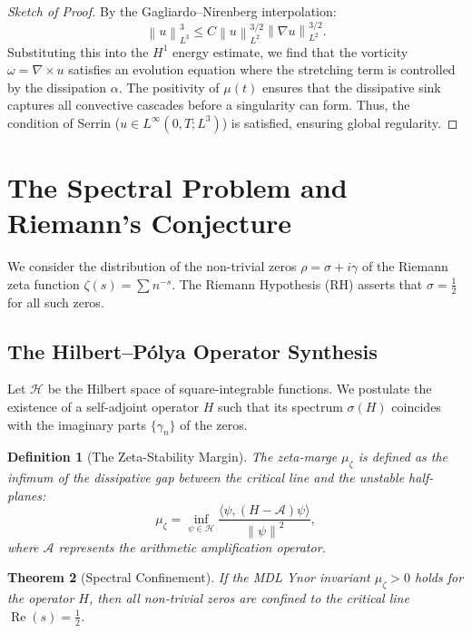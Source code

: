 \documentclass[11pt,a4paper]{amsart}
\newtheorem{theorem}{Theorem}[section]
\newtheorem{definition}[theorem]{Definition}
\newcommand{\alphacoeff}{\ensuremath{\alpha}}
\newcommand{\mumargin}{\ensuremath{\mu}}
\newcommand{\norm}[1]{\left\|#1\right\|}
\begin{document}
\begin{proof}[Sketch of Proof]
By the Gagliardo--Nirenberg interpolation:
\begin{equation}
 \norm{u}_{L^3}^3 \le C \norm{u}_{L^2}^{3/2} \norm{\nabla u}_{L^2}^{3/2}.
\end{equation}
Substituting this into the $H^1$ energy estimate, we find that the 
vorticity $\omega = \nabla \times u$ satisfies an evolution equation 
where the stretching term is controlled by the dissipation 
$\alphacoeff$. The positivity of $\mumargin(t)$ ensures that the 
dissipative sink captures all convective cascades before a singularity 
can form. Thus, the condition of Serrin ($u \in L^{\infty}(0, T; L^3)$) 
is satisfied, ensuring global regularity.
\end{proof}

\section{The Spectral Problem and Riemann's Conjecture}
We consider the distribution of the non-trivial zeros $\rho = \sigma + i\gamma$ 
of the Riemann zeta function $\zeta(s) = \sum n^{-s}$. The Riemann Hypothesis 
(RH) asserts that $\sigma = \tfrac{1}{2}$ for all such zeros.

\subsection{The Hilbert--Pólya Operator Synthesis}
Let $\mathcal{H}$ be the Hilbert space of square-integrable functions. We postulate 
the existence of a self-adjoint operator $H$ such that its spectrum 
$\sigma(H)$ coincides with the imaginary parts $\{\gamma_n\}$ of the zeros.

\begin{definition}[The Zeta-Stability Margin]
The zeta-marge $\mumargin_{\zeta}$ is defined as the infimum of the 
dissipative gap between the critical line and the unstable half-planes:
\begin{equation}
 \mumargin_{\zeta} = \inf_{\psi \in \mathcal{H}} \frac{\langle \psi, (H - \mathscr{A})\psi \rangle}{\norm{\psi}^2},
\end{equation}
where $\mathscr{A}$ represents the arithmetic amplification operator.
\end{definition}

\begin{theorem}[Spectral Confinement]
If the MDL Ynor invariant $\mumargin_{\zeta} > 0$ holds for the operator $H$, 
then all non-trivial zeros are confined to the critical line $\operatorname{Re}(s) = \tfrac{1}{2}$.
\end{theorem}
\end{document}
